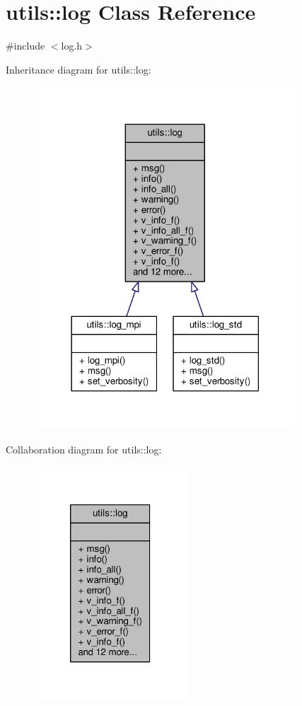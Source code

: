 \hypertarget{classutils_1_1log}{\section{utils\-:\-:log Class Reference}
\label{classutils_1_1log}
}


{\ttfamily \#include $<$log.\-h$>$}



Inheritance diagram for utils\-:\-:log\-:\nopagebreak
\begin{figure}[H]
\begin{center}
\leavevmode
\includegraphics[width=278pt]{classutils_1_1log__inherit__graph}
\end{center}
\end{figure}


Collaboration diagram for utils\-:\-:log\-:\nopagebreak
\begin{figure}[H]
\begin{center}
\leavevmode
\includegraphics[width=162pt]{classutils_1_1log__coll__graph}
\end{center}
\end{figure}
